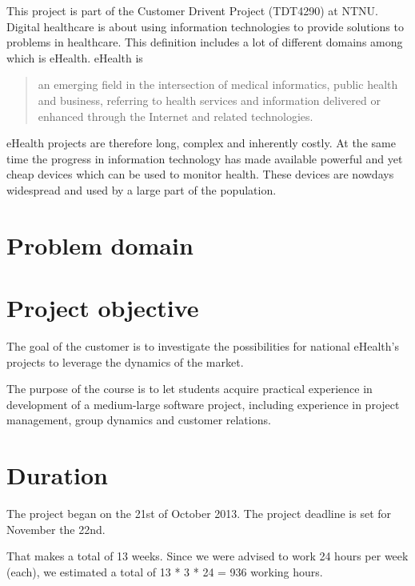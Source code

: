 This project is part of the Customer Drivent Project (TDT4290) at NTNU.
Digital healthcare is about using information technologies to provide solutions to problems in healthcare. This definition includes a lot of different domains among which is eHealth. eHealth is
\begin{quote}
an emerging field in the intersection of medical informatics, public health and business, referring to health services and information delivered or enhanced through the Internet and related technologies.\citep{ehealth}
\end{quote}
eHealth projects are therefore long, complex and inherently costly. At the same time the progress in information technology has made available powerful and yet cheap devices which can be used to monitor health. These devices are nowdays widespread and used by a large part of the population.




\section{Problem domain}




\section{Project objective}

The goal of the customer is to investigate the possibilities for national eHealth's projects to leverage the dynamics of the market.

The purpose of the course is to let students acquire practical experience in development of a medium-large software project,
including experience in project management, group dynamics and customer relations.

\section{Duration}

The project began on the 21st of October 2013.
The project deadline is set for November the 22nd.

That makes a total of 13 weeks. Since we were advised to work 24 hours per week (each), we estimated a total of 13 * 3 * 24 = 936 working hours.